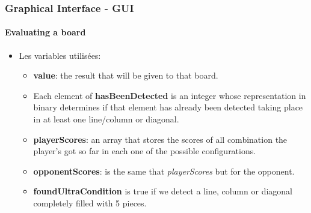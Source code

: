 \documentclass[10pt]{beamer}
\begin{document}
\begin{frame}
\frametitle{Graphical Interface - GUI}
\framesubtitle{Evaluating a board}

\begin{itemize}
  \item Les variables utilisées:
  
	\begin{itemize}
	 
	  	\item \textbf{value}: the result that will be given to that board.
		\item Each element of \textbf{hasBeenDetected} is an integer whose
		representation in binary determines if that element has already been detected 
		taking place in at least one line/column or diagonal.
		\item \textbf{playerScores}: an array that stores the scores of all 
		combination the player’s got so far in each one of the possible configurations.
		\item \textbf{opponentScores}: is the same that \textit{playerScores} but for
		the opponent.
		\item \textbf{foundUltraCondition} is true if we detect a line, column or 
		diagonal completely filled with 5 pieces.
	
	 	 
	\end{itemize}
\end{itemize}

\end{frame}
\end{document}
